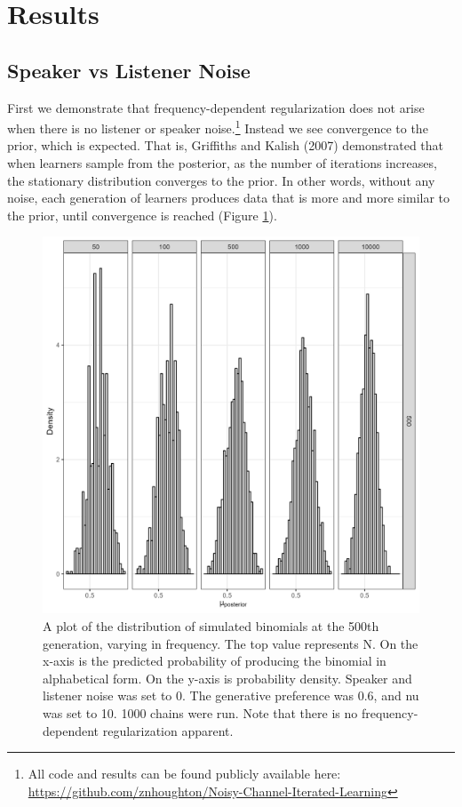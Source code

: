 \documentclass[
  jou,floatsintext]{apa6}
\begin{document}
\section{Results}\label{results}

\subsection{Speaker vs Listener Noise}\label{speaker-vs-listener-noise}

First we demonstrate that frequency-dependent regularization does not arise when there is no listener or speaker noise.\footnote{All code and results can be found publicly available here: \url{https://github.com/znhoughton/Noisy-Channel-Iterated-Learning}} Instead we see convergence to the prior, which is expected. That is, Griffiths and Kalish (2007) demonstrated that when learners sample from the posterior, as the number of iterations increases, the stationary distribution converges to the prior. In other words, without any noise, each generation of learners produces data that is more and more similar to the prior, until convergence is reached (Figure \ref{fig:noNoisePlot}).



\begin{figure}

{\centering \includegraphics[width=1\linewidth]{Figures/noNoise} 

}

\caption{A plot of the distribution of simulated binomials at the 500th generation, varying in frequency. The top value represents N. On the x-axis is the predicted probability of producing the binomial in alphabetical form. On the y-axis is probability density. Speaker and listener noise was set to 0. The generative preference was 0.6, and nu was set to 10. 1000 chains were run. Note that there is no frequency-dependent regularization apparent.}\label{fig:noNoisePlot}
\end{figure}
\end{document}
